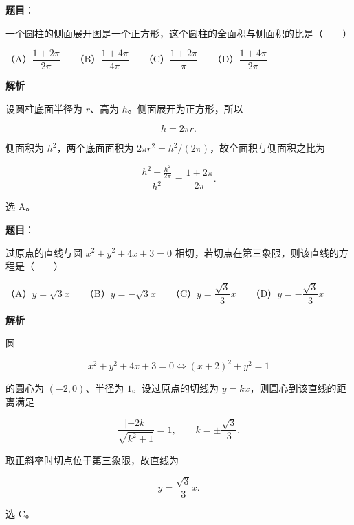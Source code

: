 \begin{answer}

\textbf{题目}：

一个圆柱的侧面展开图是一个正方形，这个圆柱的全面积与侧面积的比是\mbox{（　　）}

（A）$\dfrac{1+2\pi}{2\pi}$　　（B）$\dfrac{1+4\pi}{4\pi}$　　（C）$\dfrac{1+2\pi}{\pi}$　　（D）$\dfrac{1+4\pi}{2\pi}$

\textbf{解析}

设圆柱底面半径为 $r$、高为 $h$。侧面展开为正方形，所以

\nopagebreak[4]
\[
h=2\pi r.
\]

侧面积为 $h^2$，两个底面面积为 $2\pi r^2=h^2/(2\pi)$，故全面积与侧面积之比为

\nopagebreak[4]
\[
\frac{h^2+\frac{h^2}{2\pi}}{h^2}
=\frac{1+2\pi}{2\pi}.
\]

选 A。


\end{answer}
\begin{answer}

\textbf{题目}：

过原点的直线与圆 $x^2+y^2+4x+3=0$ 相切，若切点在第三象限，则该直线的方程是\mbox{（　　）}

（A）$y=\sqrt3x$　　（B）$y=-\sqrt3x$　　（C）$y=\dfrac{\sqrt3}{3}x$　　（D）$y=-\dfrac{\sqrt3}{3}x$

\textbf{解析}

圆

\nopagebreak[4]
\[
x^2+y^2+4x+3=0
\Longleftrightarrow
(x+2)^2+y^2=1
\]

的圆心为 $(-2,0)$、半径为 $1$。设过原点的切线为 $y=kx$，则圆心到该直线的距离满足

\nopagebreak[4]
\[
\frac{|{-2k}|}{\sqrt{k^2+1}}=1,
\qquad k=\pm\frac{\sqrt3}{3}.
\]

取正斜率时切点位于第三象限，故直线为

\nopagebreak[4]
\[
y=\frac{\sqrt3}{3}x.
\]

选 C。


\end{answer}
